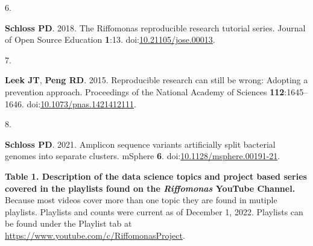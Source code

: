 \documentclass[
]{article}
\newlength{\cslhangindent}
\newlength{\csllabelwidth}
\newlength{\cslentryspacingunit} %
\newenvironment{CSLReferences}[2] %
 {%
  \setlength{\parindent}{0pt}
  \ifodd #1
  \let\oldpar\par
  \def\par{\hangindent=\cslhangindent\oldpar}
  \fi
  \setlength{\parskip}{#2\cslentryspacingunit}
 }%
 {}
\newcommand{\CSLLeftMargin}[1]{\parbox[t]{\csllabelwidth}{#1}}
\newcommand{\CSLRightInline}[1]{\parbox[t]{\linewidth - \csllabelwidth}{#1}\break}
\begin{document}
\begin{CSLReferences}{0}{1}
\leavevmode{}%
\CSLLeftMargin{6. }%
\CSLRightInline{\textbf{Schloss PD}. 2018. The {R}iffomonas reproducible
research tutorial series. Journal of Open Source Education
\textbf{1}:13.
doi:\href{https://doi.org/10.21105/jose.00013}{10.21105/jose.00013}.}

\leavevmode{}%
\CSLLeftMargin{7. }%
\CSLRightInline{\textbf{Leek JT}, \textbf{Peng RD}. 2015. Reproducible
research can still be wrong: Adopting a prevention approach. Proceedings
of the National Academy of Sciences \textbf{112}:1645--1646.
doi:\href{https://doi.org/10.1073/pnas.1421412111}{10.1073/pnas.1421412111}.}

\leavevmode{}%
\CSLLeftMargin{8. }%
\CSLRightInline{\textbf{Schloss PD}. 2021. Amplicon sequence variants
artificially split bacterial genomes into separate clusters. {mSphere}
\textbf{6}.
doi:\href{https://doi.org/10.1128/msphere.00191-21}{10.1128/msphere.00191-21}.}

\end{CSLReferences}

\newpage

\textbf{Table 1. Description of the data science topics and project
based series covered in the playlists found on the \emph{Riffomonas}
YouTube Channel.} Because most videos cover more than one topic they are
found in mutiple playlists. Playlists and counts were current as of
December 1, 2022. Playlists can be found under the Playlist tab at
\url{https://www.youtube.com/c/RiffomonasProject}.
\end{document}
